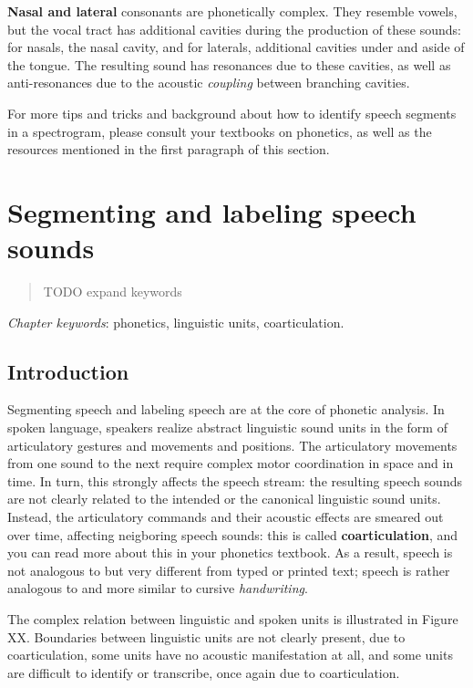 \documentclass[
]{book}
\begin{document}
\textbf{Nasal and lateral} consonants are phonetically complex. They resemble vowels, but the vocal tract has additional cavities during the production of these sounds: for nasals, the nasal cavity, and for laterals, additional cavities under and aside of the tongue. The resulting sound has resonances due to these cavities, as well as anti-resonances due to the acoustic \emph{coupling} between branching cavities.

For more tips and tricks and background about how to identify speech segments in a spectrogram, please consult your textbooks on phonetics, as well as the resources mentioned in the first paragraph of this section.

\chapter{Segmenting and labeling speech sounds}\label{ch-segmentinglabeling}

\begin{quote}
TODO expand keywords
\end{quote}

\emph{Chapter keywords}: phonetics, linguistic units, coarticulation.

\section{Introduction}\label{introduction-1}

Segmenting speech and labeling speech are at the core of phonetic analysis. In spoken language, speakers realize abstract linguistic sound units in the form of articulatory gestures and movements and positions. The articulatory movements from one sound to the next require complex motor coordination in space and in time. In turn, this strongly affects the speech stream: the resulting speech sounds are not clearly related to the intended or the canonical linguistic sound units. Instead, the articulatory commands and their acoustic effects are smeared out over time, affecting neigboring speech sounds: this is called \textbf{coarticulation}, and you can read more about this in your phonetics textbook. As a result, speech is not analogous to but very different from typed or printed text; speech is rather analogous to and more similar to cursive \emph{handwriting}.

The complex relation between linguistic and spoken units is illustrated in Figure XX. Boundaries between linguistic units are not clearly present, due to coarticulation, some units have no acoustic manifestation at all, and some units are difficult to identify or transcribe, once again due to coarticulation.
\end{document}
